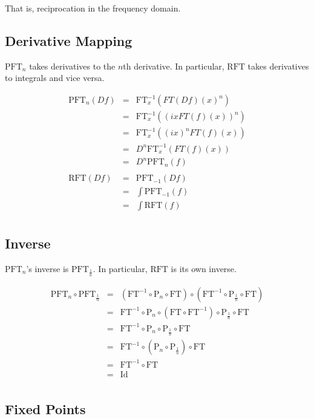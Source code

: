 \documentclass{article}
\newcommand{\RFT}{\text{RFT}}
\newcommand{\FT}{\text{FT}}
\newcommand{\PT}{\text{P}}
\newcommand{\PFT}{\text{PFT}}
\begin{document}
That is, reciprocation in the frequency domain.

\subsection{Derivative Mapping}

$\PFT_n$ takes derivatives to the $n$th derivative. In particular, $\RFT$ takes derivatives to integrals and vice versa.

\begin{eqnarray*}
\PFT_n(Df) & = & \FT^{-1}_x(FT(Df)(x)^n)\\
& = & \FT^{-1}_x((ixFT(f)(x))^n)\\
& = & \FT^{-1}_x((ix)^nFT(f)(x))\\
& = & D^n\FT^{-1}_x(FT(f)(x))\\
& = & D^n\PFT_n(f)\\
\\
\RFT(Df) & = & \PFT_{-1}(Df)\\
& = & \int\PFT_{-1}(f)\\
& = & \int\RFT(f)\\
\end{eqnarray*}

\subsection{Inverse}

$\PFT_n$'s inverse is $\PFT_\frac{1}{n}$. In particular, $\RFT$ is its own inverse.

\begin{eqnarray*}
\PFT_n ∘ \PFT_\frac{1}{n} & = & (\FT^{-1} ∘  \PT_n ∘  \FT) ∘ (\FT^{-1}  ∘ \PT_\frac{1}{n}  ∘ \FT)\\
                          & = &  \FT^{-1} ∘  \PT_n ∘ (\FT  ∘  \FT^{-1}) ∘ \PT_\frac{1}{n}  ∘ \FT \\
                          & = &  \FT^{-1} ∘  \PT_n ∘                      \PT_\frac{1}{n}  ∘ \FT \\
                          & = &  \FT^{-1} ∘ (\PT_n ∘                      \PT_\frac{1}{n}) ∘ \FT \\
                          & = &  \FT^{-1} ∘                                                  \FT \\
                          & = &  \text{Id}\\
\end{eqnarray*}

\subsection{Fixed Points}
\end{document}
